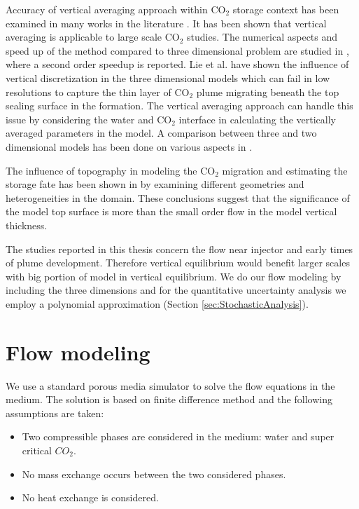 Accuracy of vertical averaging approach within $\mbox{CO}_2$ storage context has
been
examined in many works in the literature
\cite{moll2011field,lie2010accurate,class2009benchmark,grayderivation}. It has
been shown that vertical averaging is applicable to large scale $\mbox{CO}_2$
studies. The numerical aspects and speed up of the method compared to three
dimensional problem are studied in
\cite{ligaarden2010numerical,grayderivation}, where a second order
speedup is reported. Lie et al. \cite{lie2010accurate} have shown the
influence of vertical discretization in the three dimensional models which can
fail in low resolutions to capture the thin layer of $\mbox{CO}_2$ plume
migrating beneath the top sealing surface in the formation. The vertical
averaging approach can handle this issue by considering the water and
$\mbox{CO}_2$ interface in calculating the vertically averaged parameters in the
model. A comparison between three and two dimensional models has been done on
various aspects in \cite{moll2011field}.

The influence of topography in modeling the $\mbox{CO}_2$ migration
and estimating the storage fate has been shown in
\cite{syversveenstudy,grayderivation} by examining different geometries and
heterogeneities in the domain. These conclusions suggest that the significance
of the model top surface is more than the small order flow in the model vertical
thickness.

The studies reported in this thesis concern the flow near injector and early
times of plume development. Therefore vertical equilibrium would benefit larger
scales with big portion of model in vertical equilibrium. We do our flow
modeling by including the three dimensions and for the quantitative uncertainty
analysis we employ a polynomial approximation (Section
\ref{sec:StochasticAnalysis}).

\section{Flow modeling}
\label{sec:FolowModeling}

We use a standard porous media simulator to solve the flow equations in the
medium. The solution is based on finite difference method and the following
assumptions are taken:

\begin{itemize}

  \item Two compressible phases are considered in the medium: water and super
critical ${CO}_2$.
  \item No mass exchange occurs between the two considered phases.
  \item No heat exchange is considered.
 
\end{itemize}

